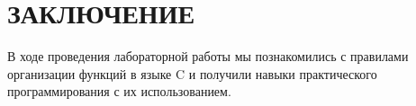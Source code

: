 \section*{ЗАКЛЮЧЕНИЕ}

В ходе проведения лабораторной работы мы познакомились с правилами
организации функций в языке C и получили навыки практического
программирования с их использованием.


\newpage

